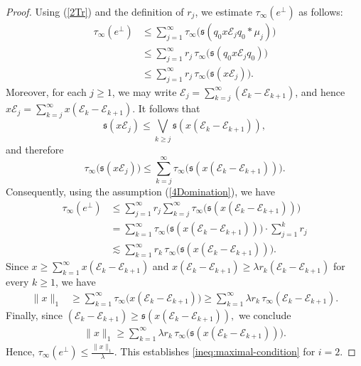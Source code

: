 \documentclass[12pt]{amsart}
\theoremstyle{remark}
\theoremstyle{definition}
\numberwithin{equation}{section}
\begin{document}
\begin{proof}
Using (\ref{2Tr}) and the definition of $r_j$, we estimate $\tau_\infty(e^\perp)$ as follows:
\begin{align*}
\tau_\infty(e^\perp)
&\le
\sum_{j=1}^\infty
\tau_\infty
\bigl({\mathfrak s}(q_0 x \mathcal{E}_j q_0 * \mu_j)\bigr)\\
&\le
\sum_{j=1}^\infty
r_j\,
\tau_\infty
\bigl({\mathfrak s}(q_0 x \mathcal{E}_j q_0)\bigr)
\\
&\le
\sum_{j=1}^\infty
r_j\,
\tau_\infty
\bigl({\mathfrak s}(x\mathcal{E}_j)\bigr).
\end{align*}
Moreover, for each $j\geq 1$, we may write
\(\mathcal{E}_j=\sum_{k=j}^{\infty}(\mathcal{E}_k - \mathcal{E}_{k+1})\), and hence
 \(x \mathcal{E}_j=\sum_{k=j}^{\infty} x 
(\mathcal{E}_k - \mathcal{E}_{k+1})\). It follows that
\[
{\mathfrak s}(x\mathcal{E}_j)
\le
\bigvee_{k\ge j}
{\mathfrak s}
\!\left(x (\mathcal{E}_k - \mathcal{E}_{k+1})\right),
\]
and therefore
\[
\tau_\infty
\bigl({\mathfrak s}(x \mathcal{E}_j)\bigr)
\le
\sum_{k=j}^{\infty}
\tau_\infty\bigl(
{\mathfrak s}
\!\left( x (\mathcal{E}_k - \mathcal{E}_{k+1})\right)
\bigr).
\]
Consequently, using 
the assumption (\ref{4Domination}), we have
\begin{align*}
\tau_\infty(e^\perp)
&\le
\sum_{j=1}^{\infty}
r_j
\sum_{k=j}^{\infty}
\tau_\infty
\bigl(
{\mathfrak s}
\!\left(x (\mathcal{E}_k - \mathcal{E}_{k+1})\right)
\bigr) \\
&=
\sum_{k=1}^{\infty}
\tau_\infty
\bigl(
{\mathfrak s}
\!\left(x (\mathcal{E}_k - \mathcal{E}_{k+1})\right)
\bigr) \cdot
\sum_{j=1}^{k}r_j \\
& \lesssim
\sum_{k=1}^{\infty}
r_k\,
\tau_\infty
\bigl(
{\mathfrak s}
\!\left(x (\mathcal{E}_k - \mathcal{E}_{k+1})\right)
\bigr).
\end{align*}
Since \(x
\ge
\sum_{k=1}^{\infty}
x (\mathcal{E}_k - \mathcal{E}_{k+1})\) and
\(x (\mathcal{E}_k - 
\mathcal{E}_{k+1})\ge\lambda r_k (\mathcal{E}_k - \mathcal{E}_{k+1})\) for every $k\geq 1$, we have
\begin{align*}
\|x\|_1
&\ge
\sum_{k=1}^{\infty}
\tau_\infty
\bigl(x (\mathcal{E}_k - \mathcal{E}_{k+1})
\bigr) \ge
\sum_{k=1}^{\infty}
\lambda r_k\,
\tau_\infty (\mathcal{E}_k - \mathcal{E}_{k+1}).
\end{align*}
Finally, since \((\mathcal{E}_k - \mathcal{E}_{k+1})
\ge {\mathfrak s}
\!\left(x(\mathcal{E}_k - \mathcal{E}_{k+1})\right),\)
we conclude 
\begin{align*}
\|x\|_1\ge
\sum_{k=1}^{\infty}
\lambda r_k\,
\tau_\infty\bigl(
{\mathfrak s}
\!\left(
x(\mathcal{E}_k - \mathcal{E}_{k+1})
\right)
\bigr).
\end{align*}
Hence, \(\tau_\infty(e^\perp)
\le\frac{\|x\|_1}{\lambda}\).
This establishes \eqref{ineq:maximal-condition} for $i=2$.






\end{proof}
\end{document}
